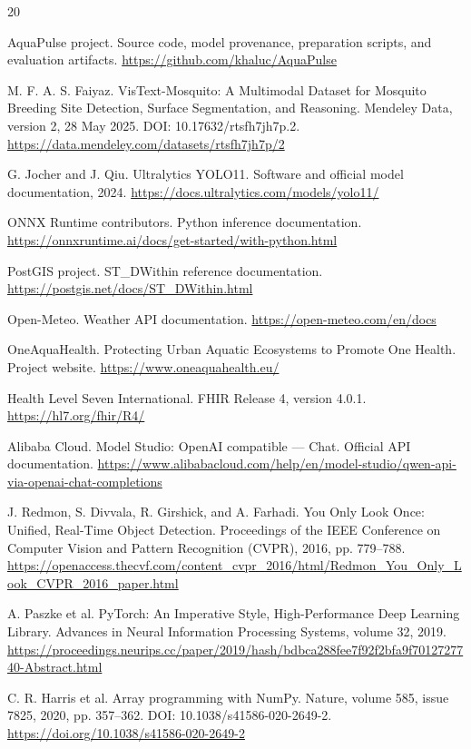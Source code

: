 \documentclass[a4paper,11pt]{article}
\begin{document}
\begin{thebibliography}{20}
\small
\setlength{\itemsep}{0.35em}

 AquaPulse project. Source code, model provenance, preparation scripts, and evaluation artifacts. \url{https://github.com/khaluc/AquaPulse}

 M. F. A. S. Faiyaz. VisText-Mosquito: A Multimodal Dataset for Mosquito Breeding Site Detection, Surface Segmentation, and Reasoning. Mendeley Data, version 2, 28 May 2025. DOI: 10.17632/rtsfh7jh7p.2. \url{https://data.mendeley.com/datasets/rtsfh7jh7p/2}

 G. Jocher and J. Qiu. Ultralytics YOLO11. Software and official model documentation, 2024. \url{https://docs.ultralytics.com/models/yolo11/}

 ONNX Runtime contributors. Python inference documentation. \url{https://onnxruntime.ai/docs/get-started/with-python.html}

 PostGIS project. ST\_DWithin reference documentation. \url{https://postgis.net/docs/ST_DWithin.html}

 Open-Meteo. Weather API documentation. \url{https://open-meteo.com/en/docs}

 OneAquaHealth. Protecting Urban Aquatic Ecosystems to Promote One Health. Project website. \url{https://www.oneaquahealth.eu/}

 Health Level Seven International. FHIR Release 4, version 4.0.1. \url{https://hl7.org/fhir/R4/}

 Alibaba Cloud. Model Studio: OpenAI compatible — Chat. Official API documentation. \url{https://www.alibabacloud.com/help/en/model-studio/qwen-api-via-openai-chat-completions}

 J. Redmon, S. Divvala, R. Girshick, and A. Farhadi. You Only Look Once: Unified, Real-Time Object Detection. Proceedings of the IEEE Conference on Computer Vision and Pattern Recognition (CVPR), 2016, pp. 779–788. \url{https://openaccess.thecvf.com/content_cvpr_2016/html/Redmon_You_Only_Look_CVPR_2016_paper.html}

 A. Paszke et al. PyTorch: An Imperative Style, High-Performance Deep Learning Library. Advances in Neural Information Processing Systems, volume 32, 2019. \url{https://proceedings.neurips.cc/paper/2019/hash/bdbca288fee7f92f2bfa9f7012727740-Abstract.html}

 C. R. Harris et al. Array programming with NumPy. Nature, volume 585, issue 7825, 2020, pp. 357–362. DOI: 10.1038/s41586-020-2649-2. \url{https://doi.org/10.1038/s41586-020-2649-2}


\end{thebibliography}
\end{document}
